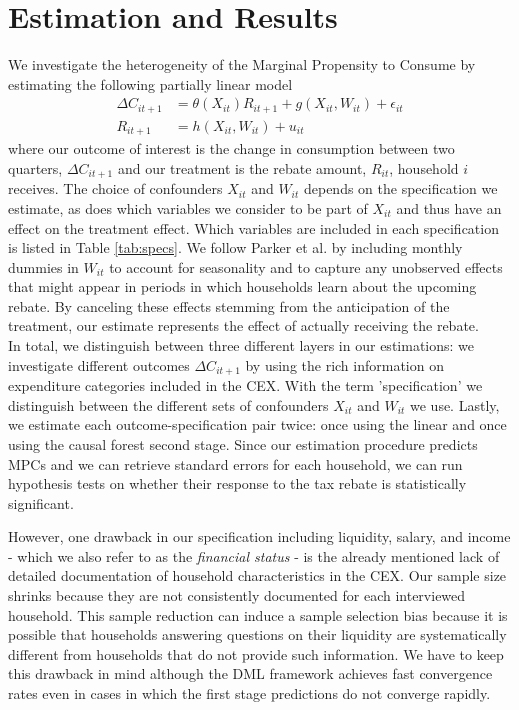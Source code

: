 \section{Estimation and Results} \label{sec:estim_res}
We investigate the heterogeneity of the Marginal Propensity to Consume by estimating the following partially linear model
\begin{align}
    \Delta C_{it+1}&=\theta(X_{it})R_{it+1}+g(X_{it}, W_{it})+\epsilon_{it} \label{eq:plm_C1}\\
    R_{it+1}&=h(X_{it}, W_{it})+u_{it} \label{eq:plm_C2}
\end{align}
where our outcome of interest is the change in consumption between two quarters, $\Delta C_{it+1}$ and our treatment is the rebate amount, $R_{it}$, household $i$ receives. The choice of confounders $X_{it}$ and $W_{it}$ depends on the specification we estimate, as does which variables we consider to be part of $X_{it}$ and thus have an effect on the treatment effect. Which variables are included in each specification is listed in Table \ref{tab:specs}. We follow Parker et al. by including monthly dummies in $W_{it}$ to account for seasonality and to capture any unobserved effects that might appear in periods in which households learn about the upcoming rebate. By canceling these effects stemming from the anticipation of the treatment, our estimate represents the effect of actually receiving the rebate. \\ 
In total, we distinguish between three different layers in our estimations: we investigate different outcomes $\Delta C_{it+1}$ by using the rich information on expenditure categories included in the CEX. With the term 'specification' we distinguish between the different sets of confounders $X_{it}$ and $W_{it}$ we use. Lastly, we estimate each outcome-specification pair twice: once using the linear and once using the causal forest second stage. Since our estimation procedure predicts MPCs and we can retrieve standard errors for each household, we can run hypothesis tests on whether their response to the tax rebate is statistically significant.

However, one drawback in our specification including liquidity, salary, and income - which we also refer to as the \textit{financial status} - is the already mentioned lack of detailed documentation of household characteristics in the CEX. Our sample size shrinks because they are not consistently documented for each interviewed household. This sample reduction can induce a sample selection bias because it is possible that households answering questions on their liquidity are systematically different from households that do not provide such information. We have to keep this drawback in mind although the DML framework achieves fast convergence rates even in cases in which the first stage predictions do not converge rapidly.

